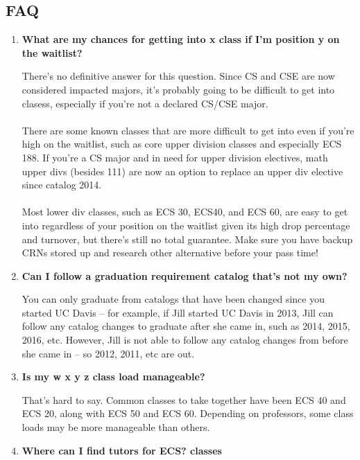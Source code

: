 \documentclass{article}
\begin{document}
\subsection {FAQ}
\begin{enumerate}
    \item \textbf{What are my chances for getting into x class if I'm position y on the waitlist?}
    \begin{itemize}
        There's no definitive answer for this question. Since CS and CSE are now considered impacted majors, it's probably going to be difficult to get into clasess, especially if you're not a declared CS/CSE major. \\\\ There are some known classes that are more difficult to get into even if you're high on the waitlist, such as core upper division classes and especially ECS 188. If you're a CS major and in need for upper division electives, math upper divs (besides 111) are now an option to replace an upper div elective since catalog 2014. \\\\ Most lower div classes, such as ECS 30, ECS40, and ECS 60, are easy to get into regardless of your position on the waitlist given its high drop percentage and turnover, but there's still no total guarantee. Make sure you have backup CRNs stored up and research other alternative before your pass time! 
    \end{itemize}
    \item \textbf{Can I follow a graduation requirement catalog that's not my own?}
    \begin{itemize}
        You can only graduate from catalogs that have been changed since you started UC Davis -- for example, if Jill started UC Davis in 2013, Jill can follow any catalog changes to graduate after she came in, such as 2014, 2015, 2016, etc. However, Jill is not able to follow any catalog changes from before she came in -- so 2012, 2011, etc are out. 
    \end{itemize}
    \item \textbf {Is my w x y z class load manageable?}
    \begin{itemize}
        That's hard to say. Common classes to take together have been ECS 40 and ECS 20, along with ECS 50 and ECS 60. Depending on professors, some class loads may be more manageable than others.
    \end{itemize}
    \item \textbf{Where can I find tutors for ECS? classes}

\end{enumerate}
\end{document}

